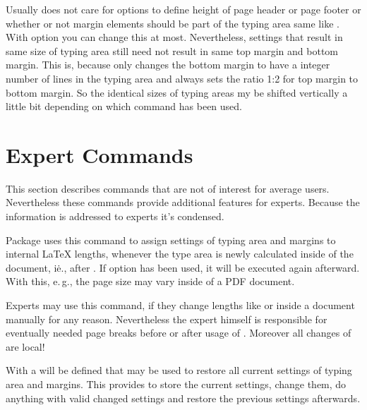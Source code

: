 \begin{Declaration}
\end{Declaration}
Usually  does not care for options to define
height of page header or page footer or whether or not margin elements should
be part of the typing area same like . With
option  you can
change this at most. Nevertheless, settings that result in same size of typing
area still need not result in same top margin and bottom margin. This is,
because  only changes the bottom margin to have
a integer number of lines in the typing area and
 always sets the ratio 1:2 for top margin to
bottom margin. So the identical sizes of typing areas my be shifted vertically
a little bit depending on which command has been used.%
\EndIndexGroup


\section{Expert Commands}

This section describes commands that are not of interest for average
users. Nevertheless these commands provide additional features for
experts. Because the information is addressed to experts it's condensed.

\begin{Declaration}
\end{Declaration}%
Package  uses this command to assign settings of typing area
and margins to internal \LaTeX{} lengths, whenever the type area is newly
calculated inside of the document, i\.e., after
. If option
 has been used, it will be executed again
afterward. With this, e.\,g., the page size may vary inside of a PDF document.

Experts may use this command, if they change lengths like 
or  inside a document manually for any reason. Nevertheless
the expert himself is responsible for eventually needed page breaks before or
after usage of . Moreover all changes of
 are local!%
% 
\EndIndexGroup


\begin{Declaration}
\end{Declaration}
With  a  will be defined that may be
used to restore all current settings of typing area and margins. This provides
to store the current settings, change them, do anything with valid changed
settings and restore the previous settings afterwards.


